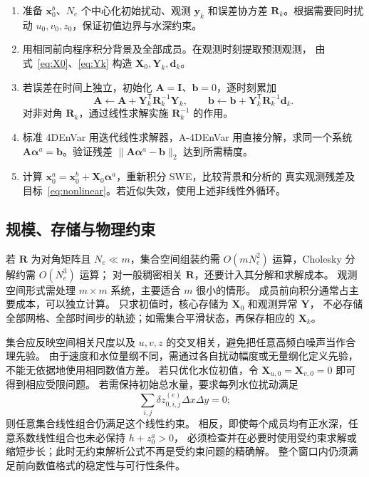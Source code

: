 \documentclass[11pt,a4paper]{article}
\newcommand{\T}{\mathsf T}
\newcommand{\Id}{\mathbf I}
\newcommand{\xx}{\mathbf x}
\newcommand{\yy}{\mathbf y}
\newcommand{\dd}{\mathbf d}
\newcommand{\avec}{\bm\alpha}
\begin{document}
\begin{enumerate}
 \item 准备 $\xx_0^b$、$N_e$ 个中心化初始扰动、观测 $\yy_k$ 和误差协方差
 $\mathbf R_k$。根据需要同时扰动 $u_0,v_0,z_0$，保证初值边界与水深约束。
 \item 用相同前向程序积分背景及全部成员。在观测时刻提取预测观测，
 由式~\eqref{eq:X0}、\eqref{eq:Yk} 构造 $\mathbf X_0,\mathbf Y_k,\dd_k$。
 \item 若误差在时间上独立，初始化 $\mathbf A=\Id$、$\mathbf b=0$，逐时刻累加
 \[
  \mathbf A\leftarrow\mathbf A+\mathbf Y_k^\T\mathbf R_k^{-1}\mathbf Y_k,
  \qquad \mathbf b\leftarrow\mathbf b+\mathbf Y_k^\T\mathbf R_k^{-1}\dd_k.
 \]
 对非对角 $\mathbf R_k$，通过线性求解实施 $\mathbf R_k^{-1}$ 的作用。
 \item 标准 4DEnVar 用迭代线性求解器，A-4DEnVar 用直接分解，求同一个系统
 $\mathbf A\avec^a=\mathbf b$。验证残差
 $\|\mathbf A\avec^a-\mathbf b\|_2$ 达到所需精度。
 \item 计算 $\xx_0^a=\xx_0^b+\mathbf X_0\avec^a$，重新积分 SWE，比较背景和分析的
 真实观测残差及目标~\eqref{eq:nonlinear}。若近似失效，使用上述非线性外循环。
\end{enumerate}

\subsection{规模、存储与物理约束}

若 $\mathbf R$ 为对角矩阵且 $N_e\ll m$，集合空间组装约需
$O(mN_e^2)$ 运算，Cholesky 分解约需 $O(N_e^3)$ 运算；
对一般稠密相关 $\mathbf R$，还要计入其分解和求解成本。
观测空间形式需处理 $m\times m$ 系统，主要适合 $m$ 很小的情形。
成员前向积分通常占主要成本，可以独立计算。
只求初值时，核心存储为 $\mathbf X_0$ 和观测异常 $\mathbf Y$，
不必存储全部网格、全部时间步的轨迹；如需集合平滑状态，再保存相应的 $\mathbf X_k$。

集合应反映空间相关尺度以及 $u,v,z$ 的交叉相关，避免把任意高频白噪声当作合理先验。
由于速度和水位量纲不同，需通过各自扰动幅度或无量纲化定义先验，不能无依据地使用相同数值方差。
若只优化水位初值，令 $\mathbf X_{u,0}=\mathbf X_{v,0}=0$ 即可得到相应受限问题。
若需保持初始总水量，要求每列水位扰动满足
\begin{equation}
 \sum_{i,j}\delta z_{0,i,j}^{(e)}\Delta x\Delta y=0;
\end{equation}
则任意集合线性组合仍满足这个线性约束。
相反，即使每个成员均有正水深，任意系数线性组合也未必保持 $h+z_0^a>0$，
必须检查并在必要时使用受约束求解或缩短步长；此时无约束解析公式不再是受约束问题的精确解。
整个窗口内仍须满足前向数值格式的稳定性与可行性条件。
\end{document}
